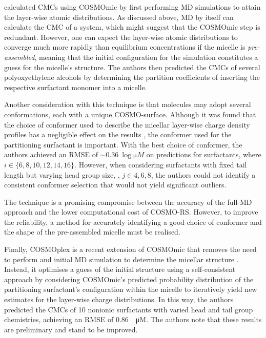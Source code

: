 \citet{jakobtorweihenPredictingCriticalMicelle2017} calculated CMCs using
COSMOmic by first performing MD simulations to attain the layer-wise atomic
distributions. As discussed above, MD by itself can calculate the CMC of a
system, which might suggest that the COSMOmic step is redundant. However, one
can expect the layer-wise atomic distributions to converge much more rapidly
than equilibrium concentrations if the micelle is \emph{pre-assembled}, meaning
that the initial configuration for the simulation constitutes a guess for the
micelle's structure. The authors then predicted the CMCs of several
polyoxyethylene alcohols by determining the partition coefficients of inserting
the respective surfactant monomer into a micelle.

Another consideration with this technique is that molecules may adopt several
conformations, each with a unique COSMO-surface. Although it was found that the
choice of conformer used to describe the micellar layer-wise charge density
profiles has a negligible effect on the results
\cite{jakobtorweihenCombinationCOSMOmicMolecular2013}, the conformer used for
the partitioning surfactant is important. With the best choice of conformer, the
authors achieved an RMSE of $\sim \SI{0.36}{\log \micro M}$ on predictions for
 surfactants, where $i \in \{6, 8, 10, 12, 14, 16\}$. However, when
considering surfactants with fixed tail length but varying head group size,
, $j \in {4, 6, 8}$, the authors could not identify a consistent
conformer selection that would not yield significant outliers.

The technique is a promising compromise between the accuracy of the full-MD
approach and the lower computational cost of COSMO-RS. However, to improve the
reliability, a method for accurately identifying a good choice of conformer and
the shape of the pre-assembled micelle must be realised.

Finally, COSMOplex is a recent extension of COSMOmic that removes the need to
perform and initial MD simulation to determine the micellar structure
\cite{klamtCOSMOplexSelfconsistentSimulation2019}. Instead, it optimises a guess
of the initial structure using a self-consistent approach by considering
COSMOmic's predicted probability distribution of the partitioning surfactant's
configuration within the micelle to iteratively yield new estimates for the
layer-wise charge distributions. In this way, the authors predicted the CMCs of
10 nonionic surfactants with varied head and tail group chemistries, achieving
an RMSE of \SI{0.86}{\log \micro M}. The authors note that these results are
preliminary and stand to be improved.

